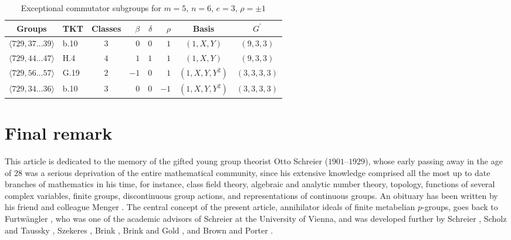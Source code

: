 \documentclass{amsart}
\theoremstyle{definition}
\numberwithin{equation}{section}
\begin{document}
\begin{table}[ht]
\caption{Exceptional commutator subgroups for \(m=5\), \(n=6\), \(e=3\), \(\rho=\pm 1\)}
\label{tbl:ComSbgSmlCyc}
\begin{center}
\begin{tabular}{|c|l|c|rrr|c|c|}
\hline
 Groups                             & TKT  & Classes & \(\beta\) & \(\delta\) & \(\rho\) & Basis           & \(G^\prime\)  \\
\hline
 \(\langle 729,37\ldots 39\rangle\) & b.10 &   \(3\) &     \(0\) &      \(0\) &    \(1\) &     \((1,X,Y)\) &   \((9,3,3)\) \\
 \(\langle 729,44\ldots 47\rangle\) & H.4  &   \(4\) &     \(1\) &      \(1\) &    \(1\) &     \((1,X,Y)\) &   \((9,3,3)\) \\
 \(\langle 729,56\ldots 57\rangle\) & G.19 &   \(2\) &    \(-1\) &      \(0\) &    \(1\) & \((1,X,Y,Y^2)\) & \((3,3,3,3)\) \\
 \(\langle 729,34\ldots 36\rangle\) & b.10 &   \(3\) &     \(0\) &      \(0\) &   \(-1\) & \((1,X,Y,Y^2)\) & \((3,3,3,3)\) \\
\hline
\end{tabular}
\end{center}
\end{table}



\section{Final remark}
\label{s:Final}

This article is dedicated to the memory of the
gifted young group theorist Otto Schreier (\(1901\)--\(1929\)),
whose early passing away in the age of \(28\)
was a serious deprivation of the entire mathematical community,
since his extensive knowledge comprised
all the most up to date branches of mathematics in his time, for instance,
class field theory, algebraic and analytic number theory,
topology, functions of several complex variables,
finite groups, discontinuous group actions, and representations of continuous groups.
An obituary has been written by his friend and colleague Menger
\cite{Me}.
The central concept of the present article,
annihilator ideals of finite metabelian \(p\)-groups,
goes back to Furtw\"angler
\cite{Fw},
who was one of the academic advisors of Schreier at the University of Vienna,
and was developed further by Schreier
\cite{Sr1,Sr2},
Scholz and Taussky
\cite{SoTa},
Szekeres
\cite{Sz1,Sz2},
Brink
\cite{Br},
Brink and Gold
\cite{BrGo},
and Brown and Porter
\cite{BwPt}.
\end{document}
